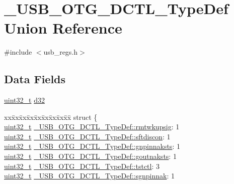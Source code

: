 \hypertarget{union___u_s_b___o_t_g___d_c_t_l___type_def}{\section{\-\_\-\-U\-S\-B\-\_\-\-O\-T\-G\-\_\-\-D\-C\-T\-L\-\_\-\-Type\-Def Union Reference}
\label{union___u_s_b___o_t_g___d_c_t_l___type_def}
}


{\ttfamily \#include $<$usb\-\_\-regs.\-h$>$}

\subsection*{Data Fields}
\begin{DoxyCompactItemize}
\item 
\hyperlink{stdint_8h_a435d1572bf3f880d55459d9805097f62}{uint32\-\_\-t} \hyperlink{group___u_s_b___o_t_g___d_r_i_v_e_r_gad10935a4e428299cce281622bdfe56fe}{d32}
\item 
\begin{tabbing}
xx\=xx\=xx\=xx\=xx\=xx\=xx\=xx\=xx\=\kill
struct \{\\
\>\hyperlink{stdint_8h_a435d1572bf3f880d55459d9805097f62}{uint32\_t} \hyperlink{group___u_s_b___o_t_g___d_r_i_v_e_r_gabb9a7d82a51be5c6bde5ec9e107ae756}{\_USB\_OTG\_DCTL\_TypeDef::rmtwkupsig}: 1\\
\>\hyperlink{stdint_8h_a435d1572bf3f880d55459d9805097f62}{uint32\_t} \hyperlink{group___u_s_b___o_t_g___d_r_i_v_e_r_gaf94e6c012ba368a29ac9e69ea7f44f73}{\_USB\_OTG\_DCTL\_TypeDef::sftdiscon}: 1\\
\>\hyperlink{stdint_8h_a435d1572bf3f880d55459d9805097f62}{uint32\_t} \hyperlink{group___u_s_b___o_t_g___d_r_i_v_e_r_gad7acaf4c455dbc42572cf9cbf2ffc23e}{\_USB\_OTG\_DCTL\_TypeDef::gnpinnaksts}: 1\\
\>\hyperlink{stdint_8h_a435d1572bf3f880d55459d9805097f62}{uint32\_t} \hyperlink{group___u_s_b___o_t_g___d_r_i_v_e_r_ga3b7b7552607f4d947024e7334f9212c1}{\_USB\_OTG\_DCTL\_TypeDef::goutnaksts}: 1\\
\>\hyperlink{stdint_8h_a435d1572bf3f880d55459d9805097f62}{uint32\_t} \hyperlink{group___u_s_b___o_t_g___d_r_i_v_e_r_gaa3c8160005524429f22fe85d778f5dcc}{\_USB\_OTG\_DCTL\_TypeDef::tstctl}: 3\\
\>\hyperlink{stdint_8h_a435d1572bf3f880d55459d9805097f62}{uint32\_t} \hyperlink{group___u_s_b___o_t_g___d_r_i_v_e_r_ga444b8daf71ae36bb5d68b2d837f436f0}{\_USB\_OTG\_DCTL\_TypeDef::sgnpinnak}: 1\\

\end{tabbing}
\end{DoxyCompactItemize}
